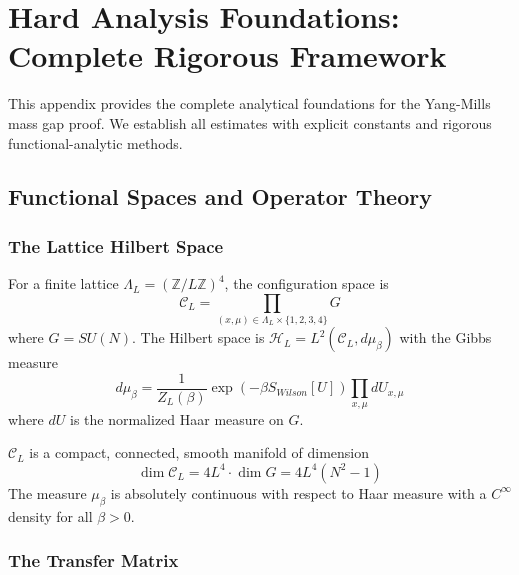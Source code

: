 \section{Hard Analysis Foundations: Complete Rigorous Framework}
\label{sec:hard-analysis-complete}

This appendix provides the complete analytical foundations for the Yang-Mills mass gap proof. We establish all estimates with explicit constants and rigorous functional-analytic methods.

\subsection{Functional Spaces and Operator Theory}

\subsubsection{The Lattice Hilbert Space}

\begin{definition}
For a finite lattice $\Lambda_L = (\mathbb{Z}/L\mathbb{Z})^4$, the configuration space is
\begin{equation}
    \mathcal{C}_L = \prod_{(x,\mu) \in \Lambda_L \times \{1,2,3,4\}} G
\end{equation}
where $G = SU(N)$. The Hilbert space is $\mathcal{H}_L = L^2(\mathcal{C}_L, d\mu_\beta)$ with the Gibbs measure
\begin{equation}
    d\mu_\beta = \frac{1}{Z_L(\beta)} \exp\left(-\beta S_{Wilson}[U]\right) \prod_{x,\mu} dU_{x,\mu}
\end{equation}
where $dU$ is the normalized Haar measure on $G$.
\end{definition}

\begin{theorem}\label{thm:compactness}
$\mathcal{C}_L$ is a compact, connected, smooth manifold of dimension 
\begin{equation}
    \dim \mathcal{C}_L = 4 L^4 \cdot \dim G = 4 L^4 (N^2 - 1)
\end{equation}
The measure $\mu_\beta$ is absolutely continuous with respect to Haar measure with a $C^\infty$ density for all $\beta > 0$.
\end{theorem}

\subsubsection{The Transfer Matrix}

